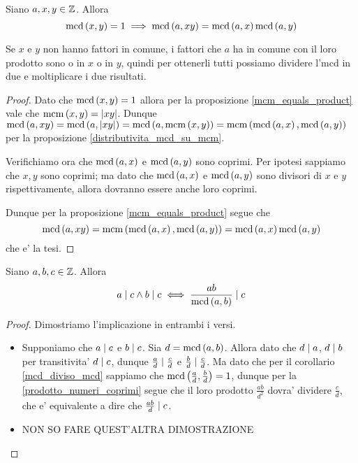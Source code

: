 \begin{proposition}
    Siano $a, x, y \in \mathbb{Z}$. Allora 
    \begin{equation}
        \operatorname{mcd}\left(x, y\right) = 1 \implies \operatorname{mcd}\left(a, xy\right) = \operatorname{mcd}\left(a, x\right)\operatorname{mcd}\left(a, y\right)
    \end{equation}
\end{proposition}
\begin{intuition}
    Se $x$ e $y$ non hanno fattori in comune, i fattori che $a$ ha in comune con il loro prodotto sono o in $x$ o in $y$, quindi per ottenerli tutti possiamo dividere l'mcd in due e moltiplicare i due risultati.
\end{intuition}
\begin{proof}
    Dato che $\operatorname{mcd}\left(x, y\right) = 1$ allora per la proposizione \ref{mcm_equals_product} vale che $\operatorname{mcm}\left(x, y\right) = \left|xy\right|$.
    Dunque $\operatorname{mcd}\left(a, xy\right) = \operatorname{mcd}\left(a, \left|xy\right|\right) = \operatorname{mcd}\left(a, \operatorname{mcm}\left(x, y\right)\right) = \operatorname{mcm}\left(\operatorname{mcd}\left(a, x\right), \operatorname{mcd}\left(a, y\right)\right)$ per la proposizione \ref{distributivita_mcd_su_mcm}.

    Verifichiamo ora che $\operatorname{mcd}\left(a, x\right)$ e $\operatorname{mcd}\left(a, y\right)$ sono coprimi. Per ipotesi sappiamo che $x, y$ sono coprimi; ma dato che $\operatorname{mcd}\left(a, x\right)$ e $\operatorname{mcd}\left(a, y\right)$ sono divisori di $x$ e $y$ rispettivamente, allora dovranno essere anche loro coprimi.

    Dunque per la proposizione \ref{mcm_equals_product} segue che \[
        \operatorname{mcd}\left(a, xy\right) = \operatorname{mcm}\left(\operatorname{mcd}\left(a, x\right), \operatorname{mcd}\left(a, y\right)\right) = \operatorname{mcd}\left(a, x\right)\operatorname{mcd}\left(a, y\right)
    \] che e' la tesi.
\end{proof}

\begin{proposition}\label{a,b|c_iff_(ab/mcd)|c}
    Siano $a, b, c \in \mathbb{Z}$. Allora \begin{equation}
        a \mid c \land b \mid c \iff \frac{ab}{\operatorname{mcd}\left(a, b\right)} \mid c
    \end{equation}
\end{proposition}
\begin{proof}
    Dimostriamo l'implicazione in entrambi i versi.
    \begin{itemize}
        \item Supponiamo che $a \mid c$ e $b \mid c$. Sia $d = \operatorname{mcd}\left(a, b\right)$. Allora dato che $d \mid a$, $d \mid b$ per transitivita' $d \mid c$, dunque $\frac{a}{d} \mid \frac{c}{d}$ e $\frac{b}{d} \mid \frac{c}{d}$. Ma dato che per il corollario \ref{mcd_diviso_mcd} sappiamo che $\operatorname{mcd}\left(\frac{a}{d}, \frac{b}{d}\right) = 1$, dunque per la \ref{prodotto_numeri_coprimi} segue che il loro prodotto $\frac{ab}{d^2}$ dovra' dividere $\frac{c}{d}$, che e' equivalente a dire che $\frac{ab}{d} \mid c$.
        \item NON SO FARE QUEST'ALTRA DIMOSTRAZIONE
    \end{itemize}
\end{proof}

